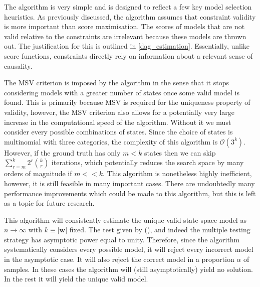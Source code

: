 \documentclass{article}
\begin{document}
The algorithm is very simple and is designed to reflect a few key model selection heuristics. As previously discussed, the algorithm assumes that constraint validity is more important than score maximisation. The scores of models that are not valid relative to the constraints are irrelevant because these models are thrown out. The justification for this is outlined in \ref{dag_estimation}. Essentially, unlike score functions, constraints directly rely on information about a relevant sense of causality.

The MSV criterion is imposed by the algorithm in the sense that it stops considering models with a greater number of states once some valid model is found. This is primarily because MSV is required for the uniqueness property of validity, however, the MSV criterion also allows for a potentially very large increase in the computational speed of the algorithm. Without it we must consider every possible combinations of states. Since the choice of states is multinomial with three categories, the complexity of this algorithm is $\mathcal{O}(3^k)$. However, if the ground truth has only $m < k$ states then we can skip $\sum_{r=m}^{k} 2^r {\binom{k}{r}}$ iterations, which potentially reduces the search space by many orders of magnitude if $m << k$. This algorithm is nonetheless highly inefficient, however, it is still feasible in many important cases. There are undoubtedly many performance improvements which could be made to this algorithm, but this is left as a topic for future research.

This algorithm will consistently estimate the unique valid state-space model as $n \rightarrow \infty$ with $k \equiv |\mathbf{w}|$ fixed. The test given by \citeauthor{srivastava2005some} (\citeyear{srivastava2005some}), and indeed the multiple testing strategy has asymptotic power equal to unity. Therefore, since the algorithm systematically considers every possible model, it will reject every incorrect model in the asymptotic case. It will also reject the correct model in a proportion $\alpha$ of samples. In these cases the algorithm will (still asymptotically) yield no solution. In the rest it will yield the unique valid model. 
\end{document}
